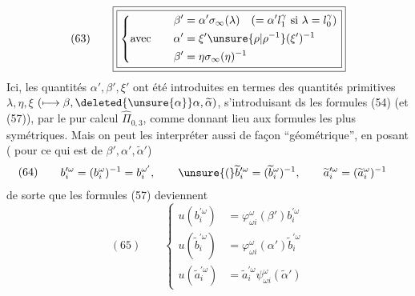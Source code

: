 \[
(63)\qquad\boxed{\boxed{\left\{\begin{aligned}
\beta'&=\alpha'\sigma_\infty(\lambda)\quad(=\alpha'l_1^\gamma\text{ si }\lambda=l_0^\gamma)\\
\text{avec}\qquad\alpha'&=\xi'\unsure{\rho|\rho^{-1}}(\xi')^{-1}\\
\beta'&=\eta\sigma_\infty(\eta)^{-1}
\end{aligned}\right.}}
\]
Ici, les quantités $\alpha',\beta',\xi'$ ont été introduites en termes des quantités primitives $\lambda,\eta,\xi$ $(\longmapsto\beta,\deleted{\unsure{\alpha}}\alpha,\widetilde\alpha)$, s'introduisant ds les formules (54) (et (57)), par le pur calcul   $\widehat\Pi_{0,3}$, comme donnant lieu aux formules les plus symétriques. Mais on peut les interpréter aussi de façon ``géométrique'', en posant ( pour ce qui est de $\beta',\alpha',\widetilde\alpha'$)
\[
(64)\qquad\begin{aligned}
b_i^{\prime\omega}&=(b_i^\omega)^{-1}=b_i^{\omega'},\qquad
\unsure{(}\widetilde b_i^{\prime\omega}=(\widetilde b_i^\omega)^{-1},\qquad
\widetilde a_i^{\prime\omega}=(\widetilde a_i^\omega)^{-1}
\end{aligned}
\]
de sorte que les formules (57) deviennent
\[
(65)\qquad\left\{\begin{aligned}
u(b_i^{\prime\omega})&=\varphi_{\omega i}^\omega(\beta')b_i^{\prime\omega}\\
u(\widetilde b_i^{\prime\omega})&=\varphi_{\omega i}^\omega(\alpha')\widetilde b_i^{\prime\omega}\\
u(\widetilde a_i^{\prime\omega})&=\widetilde a_i^{\prime\omega}\psi_{\omega i}^\omega(\widetilde\alpha')
\end{aligned}\right.
\]

